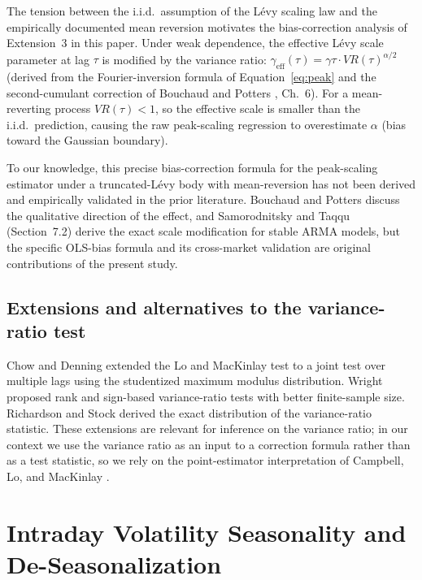\documentclass[12pt,a4paper]{article}
\begin{document}
The tension between the i.i.d.\ assumption of the Lévy scaling law and the
empirically documented mean reversion motivates the bias-correction analysis
of Extension~3 in this paper. Under weak dependence, the effective Lévy scale
parameter at lag $\tau$ is modified by the variance ratio:
$\gamma_{\mathrm{eff}}(\tau) = \gamma\tau \cdot VR(\tau)^{\alpha/2}$
(derived from the Fourier-inversion formula of Equation~\eqref{eq:peak} and
the second-cumulant correction of Bouchaud and Potters \cite{BouchaudPotters2003}, Ch.~6).
For a mean-reverting process $VR(\tau) < 1$, so the effective scale is smaller
than the i.i.d.\ prediction, causing the raw peak-scaling regression to
overestimate $\alpha$ (bias toward the Gaussian boundary).

To our knowledge, this precise bias-correction formula for the peak-scaling
estimator under a truncated-Lévy body with mean-reversion has not been derived
and empirically validated in the prior literature. Bouchaud and Potters \cite{BouchaudPotters2003}
discuss the qualitative direction of the effect, and
Samorodnitsky and Taqqu \cite{SamorodTaqqu1994} (Section~7.2) derive the exact scale modification
for stable ARMA models, but the specific OLS-bias formula and its cross-market
validation are original contributions of the present study.

\subsection{Extensions and alternatives to the variance-ratio test}

Chow and Denning \cite{ChowDenning1993} extended the Lo and MacKinlay \cite{LoMacKinlay1988} test to a
joint test over multiple lags using the studentized maximum modulus distribution.
Wright \cite{Wright2000} proposed rank and sign-based variance-ratio tests with
better finite-sample size. Richardson and Stock \cite{Richardson1991} derived the exact
distribution of the variance-ratio statistic. These extensions are relevant for
inference on the variance ratio; in our context we use the variance ratio as an
input to a correction formula rather than as a test statistic, so we rely on
the point-estimator interpretation of Campbell, Lo, and MacKinlay \cite{CampbellLoMacKinlay1997}.


\section{Intraday Volatility Seasonality and De-Seasonalization}
\label{sec:seasonality}
\end{document}
